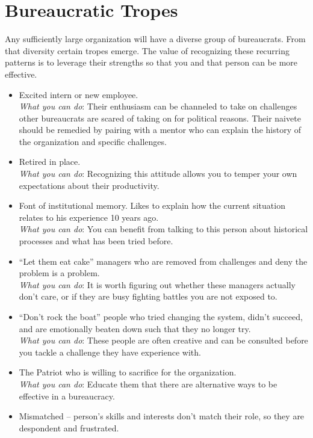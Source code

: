 \section{Bureaucratic Tropes\label{sec:tropes}}

Any sufficiently large organization will have a diverse group of bureaucrats. From that diversity certain tropes emerge. The value of recognizing these recurring patterns is to leverage their strengths so that you and that person can be more effective. 

\begin{itemize}
    \item Excited intern or new employee. \\
    \textit{What you can do}: Their enthusiasm can be channeled to take on challenges other bureaucrats are scared of taking on for political reasons. Their naivete should be remedied by pairing with a mentor who can explain the history of the organization and specific challenges.
    \item Retired in place. \\
    \textit{What you can do}: Recognizing this attitude allows you to temper your own expectations about their productivity. 
    \item Font of institutional memory. Likes to explain how the current situation relates to his experience 10 years ago. \\
    \textit{What you can do}: You can benefit from talking to this person about historical processes and what has been tried before. 
    \item ``Let them eat cake'' managers who are removed from challenges and deny the problem is a problem. \\
    \textit{What you can do}: It is worth figuring out whether these managers actually don't care, or if they are busy fighting battles you are not exposed to.
    \item ``Don't rock the boat'' people who tried changing the system, didn't succeed, and are emotionally beaten down such that they no longer try. \\
    \textit{What you can do}: These people are often creative and can be consulted before you tackle a challenge they have experience with. 
    \item The Patriot who is willing to sacrifice for the organization. \\
    \textit{What you can do}: Educate them that there are alternative ways to be effective in a bureaucracy.
    \item Mismatched -- person's skills and interests don't match their role, so they are despondent and frustrated. \\

\end{itemize}
